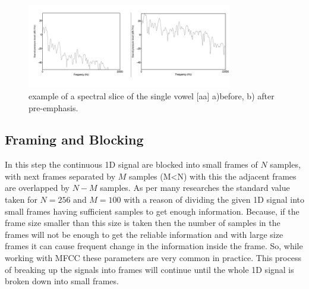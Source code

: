 \documentclass[12pt, a4paper, twoside]{report}
\begin{document}
\begin{figure}[!h]
	\centering
	\includegraphics[width=0.8\textwidth]
	{images/chapter3/pre-emphasis}
	\caption{example of a spectral slice of the single vowel [aa]  a)before,  b) after pre-emphasis.}
	\label{fig:pre-emphasis}
\end{figure}

\subsection{Framing and Blocking}
In this step the continuous 1D signal are blocked into small frames of $N$ samples, with next frames separated by $M$ samples (M<N) with this the adjacent frames are overlapped by $N-M$ samples. As per many researches the standard value taken for $N=256$ and $M=100$ with a reason of dividing the given 1D  signal  into  small  frames  having  sufficient  samples  to  get  enough  information.  Because, if the frame size smaller than this size is taken then the number of samples in the frames will not be enough  to  get  the  reliable  information  and  with  large  size  frames  it  can  cause  frequent  change  in  the  information  inside  the  frame.  So, while   working with MFCC  these  parameters  are  very  common  in  practice. This process of breaking up the signals into frames will continue until the whole 1D signal is broken down into small frames.
\end{document}
